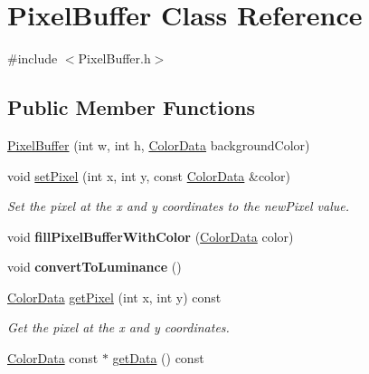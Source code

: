 \hypertarget{classPixelBuffer}{\section{Pixel\-Buffer Class Reference}
\label{classPixelBuffer}
}


{\ttfamily \#include $<$Pixel\-Buffer.\-h$>$}

\subsection*{Public Member Functions}
\begin{DoxyCompactItemize}
\item 
\hyperlink{classPixelBuffer_ae373904fcdd3c820677b959354b75410}{Pixel\-Buffer} (int w, int h, \hyperlink{classColorData}{Color\-Data} background\-Color)
\item 
\hypertarget{classPixelBuffer_abe673364dfceec95783e1dfb00ec9bd1}{void \hyperlink{classPixelBuffer_abe673364dfceec95783e1dfb00ec9bd1}{set\-Pixel} (int x, int y, const \hyperlink{classColorData}{Color\-Data} \&color)}\label{classPixelBuffer_abe673364dfceec95783e1dfb00ec9bd1}

\begin{DoxyCompactList}\small\item\em Set the pixel at the x and y coordinates to the new\-Pixel value. \end{DoxyCompactList}\item 
\hypertarget{classPixelBuffer_a1bdab74553ab7d569629a42a808b4785}{void {\bfseries fill\-Pixel\-Buffer\-With\-Color} (\hyperlink{classColorData}{Color\-Data} color)}\label{classPixelBuffer_a1bdab74553ab7d569629a42a808b4785}

\item 
\hypertarget{classPixelBuffer_a73f0518c147ad7900a64b4ffa205b9fc}{void {\bfseries convert\-To\-Luminance} ()}\label{classPixelBuffer_a73f0518c147ad7900a64b4ffa205b9fc}

\item 
\hypertarget{classPixelBuffer_ae01450fb4e9824c1e93e92f4377e9924}{\hyperlink{classColorData}{Color\-Data} \hyperlink{classPixelBuffer_ae01450fb4e9824c1e93e92f4377e9924}{get\-Pixel} (int x, int y) const }\label{classPixelBuffer_ae01450fb4e9824c1e93e92f4377e9924}

\begin{DoxyCompactList}\small\item\em Get the pixel at the x and y coordinates. \end{DoxyCompactList}\item 
\hypertarget{classPixelBuffer_a4b9ebe9181f451aa7c9858e400245e73}{\hyperlink{classColorData}{Color\-Data} const $\ast$ \hyperlink{classPixelBuffer_a4b9ebe9181f451aa7c9858e400245e73}{get\-Data} () const }\label{classPixelBuffer_a4b9ebe9181f451aa7c9858e400245e73}


\end{DoxyCompactItemize}
